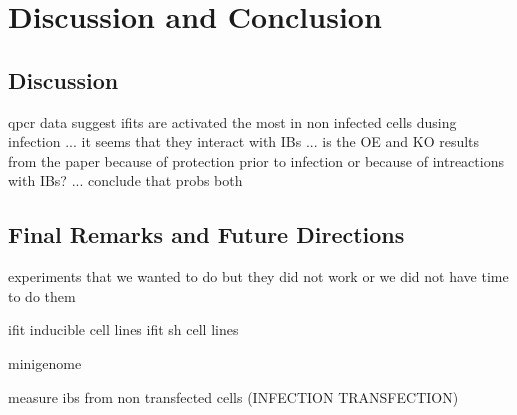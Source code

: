 \chapter{Discussion and Conclusion}
\section{Discussion}

qpcr data suggest ifits are activated the most in non infected cells dusing infection ... it seems that they interact with IBs ... is the OE and KO results from the paper because of protection prior to infection or because of intreactions with IBs? ... conclude that probs both




\section{Final Remarks and Future Directions}
experiments that we wanted to do but they did not work or we did not have time to do them

ifit inducible cell lines
ifit sh cell lines

minigenome

measure ibs from non transfected cells (INFECTION TRANSFECTION)


